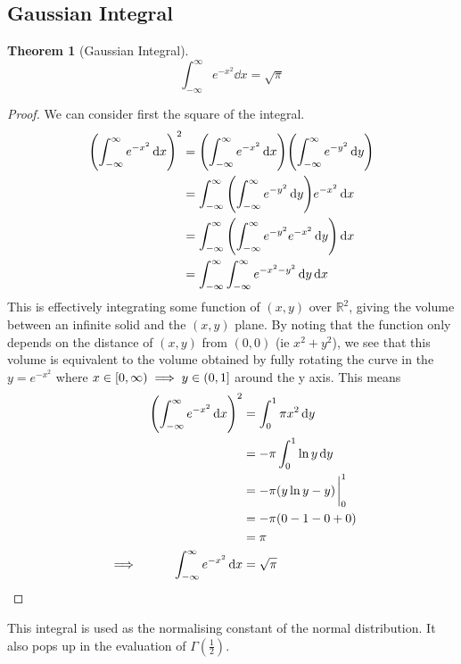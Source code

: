 \documentclass[fleqn,a4paper,11pt]{article}
\newcommand{\setstyle}{\mathbb}
\newcommand{\Reals}{\setstyle R}
\newtheorem{theorem}{Theorem}[section]
\begin{document}
    \subsection{Gaussian Integral}

    \begin{theorem}[Gaussian Integral] \label{thm_gauss_integral}
    \begin{equation*}
    \int_{-\infty}^\infty e^{-x^2} \dd{x} = \sqrt \pi
    \end{equation*}
    \end{theorem}
    \begin{proof}
    We can consider first the square of the integral.
    \begin{align*}
    \pqty{\int_{-\infty}^\infty e^{-x^2} \dd{x}}^2
        &= \pqty{\int_{-\infty}^\infty e^{-x^2} \dd{x}}
           \pqty{\int_{-\infty}^\infty e^{-y^2} \dd{y}} \\
        &= \int_{-\infty}^\infty
                       \pqty{\int_{-\infty}^\infty e^{-y^2} \dd{y}}
                   e^{-x^2} \dd{x} \\
        &= \int_{-\infty}^\infty
               \pqty{\int_{-\infty}^\infty e^{-y^2} e^{-x^2} \dd{y}} \dd{x} \\
        &= \int_{-\infty}^\infty
               \int_{-\infty}^\infty e^{-x^2-y^2} \dd{y} \dd{x}
    \end{align*}
    This is effectively integrating some function of \((x, y)\) over
    \(\Reals^2\), giving the volume between an infinite solid and the \((x, y)\)
    plane. By noting that the function only depends on the distance of
    \((x, y)\) from \((0, 0)\) (ie \(x^2 + y^2\)), we see that this volume is
    equivalent to the volume obtained by fully rotating the curve in the
    \(y = e^{-x^2}\) where
    \(x \in \intco{0, \infty} \implies y \in \intoc{0, 1}\) around the y axis.
    This means
    \begin{alignat*}{2}
    && \pqty{\int_{-\infty}^\infty e^{-x^2} \dd{x}}^2
        &= \int_0^1 \pi x^2 \dd{y} \\
    &&  &= -\pi \int_0^1 \ln y \dd{y} \\
    &&  &= -\pi (y\ln y - y)\eval_0^1 \\
    &&  &= -\pi \pqty{0 - 1 - 0 + 0} \\
    &&  &= \pi \\
    &\implies& \int_{-\infty}^\infty e^{-x^2} \dd{x}
        &= \sqrt \pi \tag*{\qedhere}
    \end{alignat*}
    \end{proof}
    This integral is used as the normalising constant of the normal
    distribution. It also pops up in the evaluation of \(\Gamma(\frac 12)\).
\end{document}
